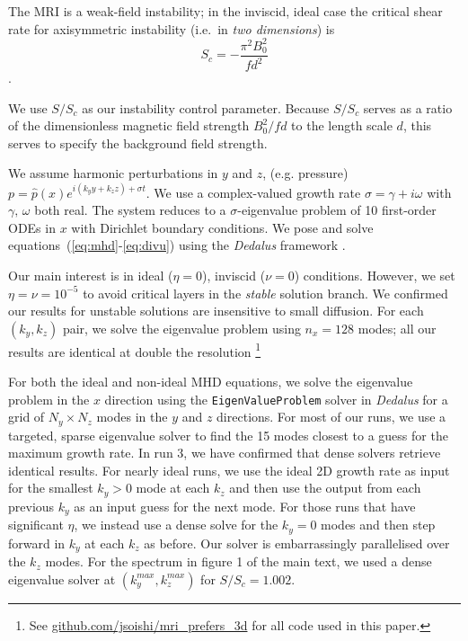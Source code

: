 \documentclass{rsproca_new}%
\newcommand{\SSC}{S/S_{c}}
\begin{document}
The MRI is a weak-field instability; in the inviscid, ideal case the critical shear rate for axisymmetric instability (i.e.\ in \emph{two dimensions}) is
\begin{equation}\label{eq:Sc}
  S_{c}=-\frac{\pi^{2}B_{0}^2}{fd^2}
\end{equation}
\cite{2015RSPSA.47140699V}.

We use $\SSC$ as our instability control parameter.
Because $\SSC$ serves as a ratio of the dimensionless magnetic field strength $B_0^2/f d$ to the length scale $d$, this serves to specify the background field strength.

We assume harmonic perturbations in $y$ and $z$, (e.g. pressure) $p=\hat{p}(x)e^{i(k_{y}y+k_{z}z)+\sigma{t}}$. 
We use a complex-valued growth rate $\sigma=\gamma+i\omega$ with $\gamma,\,\omega$ both real. 
The system reduces to a $\sigma$-eigenvalue problem of 10 first-order ODEs in $x$ with Dirichlet boundary conditions.
We pose and solve equations~(\ref{eq:mhd}-\ref{eq:divu}) using the \emph{Dedalus} framework \cite{2019arXiv190510388B}.

Our main interest is in ideal ($\eta=0$), inviscid ($\nu=0$) conditions.
However, we set $\eta=\nu=10^{-5}$ to avoid critical layers in the \textit{stable} solution branch.
We confirmed our results for unstable solutions are insensitive to small diffusion. 
For each $(k_{y},k_{z})$ pair, we solve the eigenvalue problem using $n_{x}=128$ modes; all our results are identical at double the resolution \footnote{See \protect\url{github.com/jsoishi/mri_prefers_3d} for all code used in this paper.}

For both the ideal and non-ideal MHD equations, we solve the eigenvalue problem in the $x$ direction using the \texttt{EigenValueProblem} solver in \emph{Dedalus} for a grid of $N_y \times N_z$ modes in the $y$ and $z$ directions.
For most of our runs, we use a targeted, sparse eigenvalue solver to find the 15 modes closest to a guess for the maximum growth rate.
In run 3, we have confirmed that dense solvers retrieve identical results.
For nearly ideal runs, we use the ideal 2D growth rate as input for the smallest $k_{y} > 0$ mode at each $k_{z}$ and then use the output from each previous $k_{y}$ as an input guess for the next mode.
For those runs that have significant $\eta$, we instead use a dense solve for the $k_{y} = 0$ modes and then step forward in $k_{y}$ at each $k_{z}$ as before.
Our solver is embarrassingly parallelised over the $k_{z}$ modes.
For the spectrum in figure 1 of the main text, we used a dense eigenvalue solver at $(k_{y}^{max},k_{z}^{max})$ for $\SSC= 1.002$.
\end{document}
